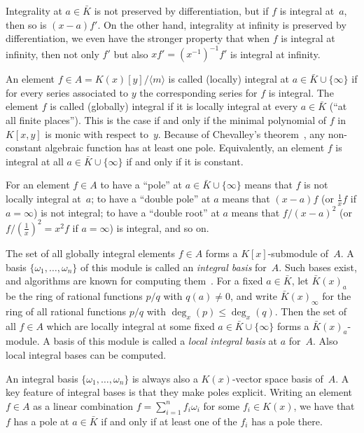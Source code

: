\documentclass{sig-alternate}
\begin{document}
Integrality at $a\in\bar K$ is not preserved by differentiation,
but if $f$ is integral at~$a$, then so is $(x-a)f'$. On the other hand,
integrality at infinity is preserved by differentiation, we even have the
stronger property that when $f$ is integral at infinity, then not only $f'$ but also $xf'=(x^{-1})^{-1}f'$ is
integral at infinity.

An element $f\in A=K(x)[y]/\langle m\rangle$
is called (locally) integral at $a\in\bar K\cup\{\infty\}$ if for every series
associated to $y$ the corresponding series for $f$ is integral.
The element $f$ is called (globally) integral if it is locally integral at every
$a\in\bar K$ (``at all finite places'').
This is the case if and only if the minimal polynomial of $f$ in $K[x,y]$ is monic
with respect to~$y$.
Because of Chevalley's theorem~\cite[page 9, Corollary 3]{Chevalley1951}, any
non-constant algebraic function has at least one pole. Equivalently, an element $f$ is
integral at all $a\in\bar K\cup\{\infty\}$ if and only if it is constant.

For an element $f\in A$ to have a ``pole'' at $a\in\bar K\cup\{\infty\}$ means
that $f$ is not locally integral at~$a$; to have a ``double pole'' at $a$ means
that $(x-a)f$ (or $\frac1xf$ if $a=\infty$) is not integral; to have a ``double
root'' at $a$ means that $f/(x-a)^2$ (or $f/(\frac1x)^2=x^2f$ if $a=\infty$) is integral,
and so on.

The set of all globally integral elements $f\in A$ forms a $K[x]$-submodule of~$A$.
A basis $\{\omega_1,\dots,\omega_n\}$ of this module is called an \emph{integral basis}
for~$A$. Such bases exist, and algorithms are known for computing them~\cite{trager84,Rybowicz:1991:ACI:120694.120715,vanHoeij94}.
For a fixed $a\in\bar K$, let $\bar K(x)_a$ be the ring of rational functions $p/q$
with $q(a)\neq0$, and write $\bar K(x)_\infty$ for the ring of all
rational functions $p/q$ with $\deg_x(p)\leq\deg_x(q)$.
Then the set of all $f\in A$ which are locally integral at some
fixed $a\in\bar K\cup\{\infty\}$ forms a $\bar K(x)_a$-module. A basis of this module is
called a \emph{local integral basis} at $a$ for~$A$. Also local integral bases can
be computed.

An integral basis $\{\omega_1,\dots,\omega_n\}$ is always also a $K(x)$-vector space
basis of~$A$. A key feature of integral bases is that they make poles explicit. Writing
an element $f\in A$ as a linear combination $f=\sum_{i=1}^n f_i\omega_i$ for some
$f_i\in K(x)$, we have that $f$ has a pole at $a\in\bar K$ if and only if at least one
of the $f_i$ has a pole there.
\end{document}

